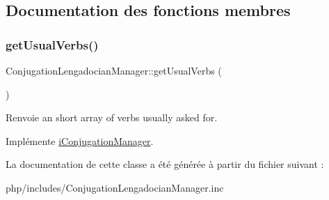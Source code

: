\subsection{Documentation des fonctions membres}
\hypertarget{classConjugationLengadocianManager_a1ec18e3663eae35578b4f1967e4d981d}{}\label{classConjugationLengadocianManager_a1ec18e3663eae35578b4f1967e4d981d} 
\subsubsection{\texorpdfstring{get\+Usual\+Verbs()}{getUsualVerbs()}}
{\footnotesize\ttfamily Conjugation\+Lengadocian\+Manager\+::get\+Usual\+Verbs (\begin{DoxyParamCaption}{ }\end{DoxyParamCaption})}

\begin{DoxyReturn}{Renvoie}
an short array of verbs usually asked for. 
\end{DoxyReturn}


Implémente \hyperlink{interfaceiConjugationManager_a2a7ed39313c1c92ef5c01c88895de36e}{i\+Conjugation\+Manager}.



La documentation de cette classe a été générée à partir du fichier suivant \+:\begin{DoxyCompactItemize}
\item 
php/includes/Conjugation\+Lengadocian\+Manager.\+inc\end{DoxyCompactItemize}
